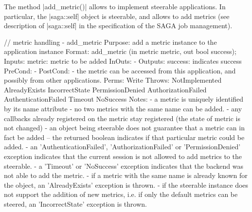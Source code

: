     The method |add_metric()| allows to implement steerable
    applications.  In particular, the |saga::self| object is
    steerable, and allows to add metrics (see description of
    |saga::self| in the specification of the SAGA job
    management).
 
 
 \begin{myspec}
    // metric handling
    - add_metric
      Purpose:  add a metric instance to the application 
                instance
      Format:   add_metric         (in  metric  metric,
                                    out bool    success);
      Inputs:   metric:             metric to be added
      InOuts:   -
      Outputs:  success:            indicates success
      PreCond:  -
      PostCond: - the metric can be accessed from this
                  application, and possibly from other
                  applications.
      Perms:    Write
      Throws:   NotImplemented
                AlreadyExists
                IncorrectState
                PermissionDenied
                AuthorizationFailed
                AuthenticationFailed
                Timeout
                NoSuccess
      Notes:    - a metric is uniquely identified by its name
                  attribute - no two metrics with the same name
                  can be added.
                - any callbacks already registered on the metric
                  stay registered (the state of metric is not
                  changed)
                - an object being steerable does not guarantee
                  that a metric can in fact be added -- the
                  returned boolean indicates if that particular
                  metric could be added.
                - an 'AuthenticationFailed', 
                  'AuthorizationFailed' or 'PermissionDenied'
                  exception indicates that the current session
                  is not allowed to add metrics to the 
                  steerable.
                - a 'Timeout' or 'NoSuccess' exception indicates
                  that the backend was not able to add the 
                  metric.
                - if a metric with the same name is already
                  known for the object, an 'AlreadyExists'
                  exception is thrown.
                - if the steerable instance does not support the
                  addition of new metrics, i.e. if only the
                  default metrics can be steered, an 
                  'IncorrectState' exception is thrown.
 

\end{myspec}
